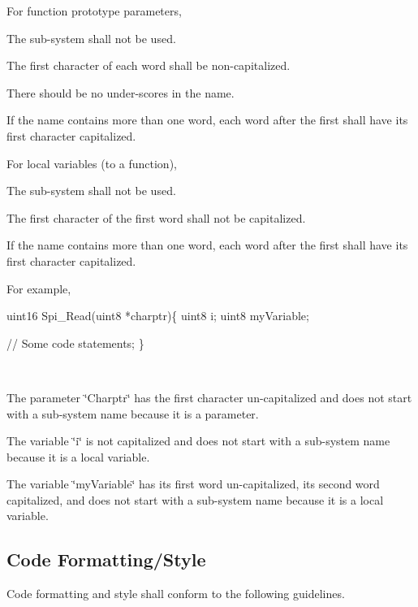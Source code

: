 For function prototype parameters,
\begin{DoxyItemize}
\item The sub-\/system shall not be used.
\item The first character of each word shall be non-\/capitalized.
\item There should be no under-\/scores in the name.
\item If the name contains more than one word, each word after the first shall have its first character capitalized.
\end{DoxyItemize}

For local variables (to a function),
\begin{DoxyItemize}
\item The sub-\/system shall not be used.
\item The first character of the first word shall not be capitalized.
\item If the name contains more than one word, each word after the first shall have its first character capitalized.
\end{DoxyItemize}

For example,~\newline
~\newline



\begin{DoxyCode}
uint16 Spi\_Read(uint8 *charptr)\{
  uint8 i;
  uint8 myVariable;

  \textcolor{comment}{// Some code}
  statements;
\}
\end{DoxyCode}
~\newline



\begin{DoxyItemize}
\item The parameter \char`\"{}\+Charptr\char`\"{} has the first character un-\/capitalized and does not start with a sub-\/system name because it is a parameter.
\item The variable \char`\"{}i\char`\"{} is not capitalized and does not start with a sub-\/system name because it is a local variable.
\item The variable \char`\"{}my\+Variable\char`\"{} has it\textquotesingle{}s first word un-\/capitalized, it\textquotesingle{}s second word capitalized, and does not start with a sub-\/system name because it is a local variable.
\end{DoxyItemize}\hypertarget{index_CF}{}\subsection{Code Formatting/\+Style}\label{index_CF}
Code formatting and style shall conform to the following guidelines.


